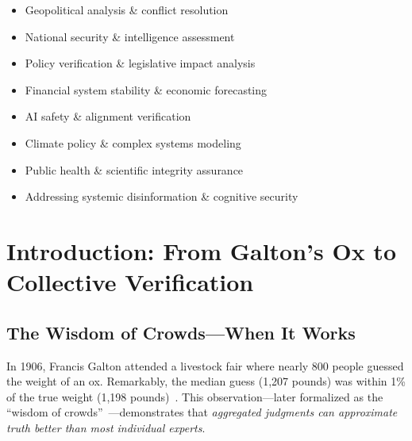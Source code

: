 \documentclass[11pt,a4paper]{article}
\theoremstyle{definition}
\theoremstyle{remark}
\begin{document}
\begin{small}
\begin{center}
\begin{minipage}{0.88\textwidth}
\begin{itemize}[nosep, itemsep=0.2em, topsep=0pt, leftmargin=1.5em]
    \item Geopolitical analysis \& conflict resolution
    \item National security \& intelligence assessment
    \item Policy verification \& legislative impact analysis
    \item Financial system stability \& economic forecasting
    \item AI safety \& alignment verification
    \item Climate policy \& complex systems modeling
    \item Public health \& scientific integrity assurance
    \item Addressing systemic disinformation \& cognitive security
\end{itemize}
\end{minipage}
\end{center}
\end{small}

\clearpage

\section{Introduction: From Galton's Ox to Collective Verification}

\subsection{The Wisdom of Crowds—When It Works}

In 1906, Francis Galton attended a livestock fair where nearly 800 people guessed the weight of an ox. Remarkably, the median guess (1,207 pounds) was within 1\% of the true weight (1,198 pounds)~\citep{galton1907vox}. This observation—later formalized as the ``wisdom of crowds''~\citep{surowiecki2004wisdom}—demonstrates that \textit{aggregated judgments can approximate truth better than most individual experts}.
\end{document}
